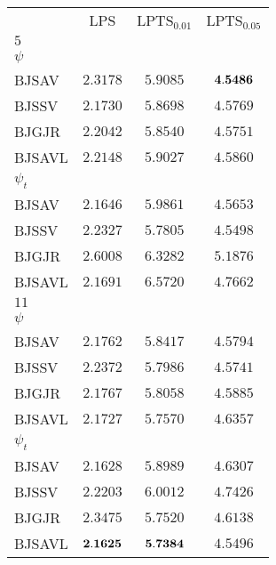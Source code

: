 \documentclass[12pt]{article}
\theoremstyle{plain}
\numberwithin{equation}{section}
\begin{document}
\begin{table}[h!]
\begin{center}
\begin{small}\begin{tabular}{ l c c c }
\hline\hline
{}&{LPS}&{LPTS$_{0.01}$}&{LPTS$_{0.05}$}\\
{$5$} &{}&{}&{}\\
{$\psi$} \\
 {BJSAV}&    $2.3178$              &     $5.9085$             &     ${\bf{4.5486}}$       \\
{BJSSV}&     $2.1730$              &     $5.8698$             &     $4.5769$       \\
{BJGJR}&     $2.2042$              &     $5.8540$             &     $4.5751$        \\
{BJSAVL}&   $2.2148$              &     $5.9027$             &     $4.5860$        \\
{$\psi_t$} \\
 {BJSAV}&     $2.1646$             &     $5.9861$               &     $4.5653$      \\
{BJSSV}&     $2.2327$              &     $5.7805$               &     $4.5498$      \\
{BJGJR}&     $2.6008$              &     $6.3282$               &     $5.1876$      \\
{BJSAVL}&   $2.1691$               &     $6.5720$              &     $4.7662$      \\\hline
{$11$} &{}&{}&{}\\ 
{$\psi$} \\
 {BJSAV}&    $2.1762$               &     $5.8417$            &     $4.5794$      \\
{BJSSV}&     $2.2372$              &     $5.7986$             &     $4.5741$      \\
{BJGJR}&     $2.1767$              &     $5.8058$             &     $4.5885$      \\
{BJSAVL}&   $2.1727$              &     $5.7570$             &     $4.6357$      \\
{$\psi_t$} \\
 {BJSAV}&    $2.1628$                 &     $5.8989$             &     $4.6307$      \\
{BJSSV}&     $2.2203$                 &    $6.0012$              &     $4.7426$      \\
{BJGJR}&     $2.3475$                 &    $5.7520$              &     $4.6138$      \\
{BJSAVL}&   ${\bf{2.1625}}$         &     ${\bf{5.7384}}$    &     $4.5496$      \\\hline

\end{tabular}
\end{small}
\end{center}
\end{table}
\end{document}
